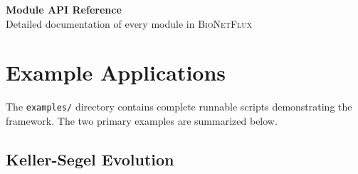 \documentclass[11pt,a4paper]{article}
\newcommand{\code}[1]{\texttt{#1}}
\newcommand{\bionetflux}{\textsc{BioNetFlux}}
\begin{document}




\clearpage
\thispagestyle{empty}
\vspace*{\fill}
\begin{center}
	{\Huge \textbf{Module API Reference}}\\[1cm]
	{\Large Detailed documentation of every module in \bionetflux{}}
\end{center}
\vspace*{\fill}
\clearpage


















\section{Example Applications}
\label{sec:examples}

The \code{examples/} directory contains complete runnable scripts demonstrating the framework.  The two primary examples are summarized below.

\subsection{Keller-Segel Evolution}
\end{document}
